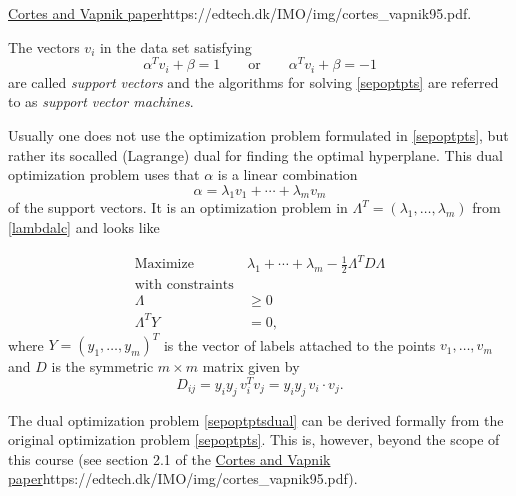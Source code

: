 \documentclass{article}
\begin{document}
    \url{Cortes and Vapnik  paper}{https://edtech.dk/IMO/img/cortes_vapnik95.pdf}.

  The vectors $v_i$ in the data set satisfying
  $$
    \alpha^T v_i + \beta = 1\qquad\text{or}\qquad\alpha^T v_i + \beta = -1
  $$
  are called \emph{support vectors} and the algorithms for solving \eqref{sepoptpts} are
  referred to as \emph{support vector machines}. 

Usually one does not use the optimization problem formulated in \eqref{sepoptpts}, but
rather its socalled (Lagrange) dual for finding the optimal hyperplane. This dual
optimization problem uses that $\alpha$ is a linear combination
\begin{equation}\label{lambdalc}
\alpha = \lambda_1 v_1 + \cdots + \lambda_m v_m
\end{equation}
of the support vectors. It is an optimization problem
in $\Lambda^T = (\lambda_1,\dots, \lambda_m)$
from \eqref{lambdalc} and looks like

    \begin{align} \label{sepoptptsdual}
    \text{Maximize}\qquad\quad &\lambda_1 + \cdots + \lambda_m - \frac{1}{2} \Lambda^T D \Lambda\\
     \text{with constraints}&\\
    \Lambda &\geq 0\\
    \Lambda^T Y &= 0,
    \end{align}
    where $Y =(y_1, \dots, y_m)^T$ is the vector of labels attached to
    the points $v_1, \dots, v_m$ and $D$ is the symmetric $m\times m$
    matrix given by
    \begin{equation}
    D_{ij} = y_i y_j\, v^T_i v_j = y_i y_j\, v_i\cdot v_j.
    \end{equation}

    The dual optimization problem \eqref{sepoptptsdual} can be derived
    formally from the original optimization problem
    \eqref{sepoptpts}. This is, however, beyond the scope of this
    course (see section 2.1 of the \url{Cortes and Vapnik paper}{https://edtech.dk/IMO/img/cortes_vapnik95.pdf}).
\end{document}
